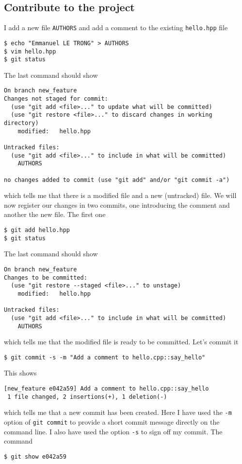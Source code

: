 \documentclass[a4paper]{article}
\begin{document}
\subsection{Contribute to the project}
I add a new file \texttt{AUTHORS} and add a comment to the existing \texttt{hello.hpp} file
\begin{verbatim}
$ echo "Emmanuel LE TRONG" > AUTHORS
$ vim hello.hpp
$ git status
\end{verbatim}
The last command should show
\begin{verbatim}
On branch new_feature
Changes not staged for commit:
  (use "git add <file>..." to update what will be committed)
  (use "git restore <file>..." to discard changes in working directory)
	modified:   hello.hpp

Untracked files:
  (use "git add <file>..." to include in what will be committed)
	AUTHORS

no changes added to commit (use "git add" and/or "git commit -a")
\end{verbatim}
which tells me that there is a modified file and a new (untracked) file.
We will now register our changes in two commits, one introducing the comment and
another the new file. The first one
\begin{verbatim}
$ git add hello.hpp
$ git status
\end{verbatim}
The last command should show
\begin{verbatim}
On branch new_feature
Changes to be committed:
  (use "git restore --staged <file>..." to unstage)
	modified:   hello.hpp

Untracked files:
  (use "git add <file>..." to include in what will be committed)
	AUTHORS
\end{verbatim}
which tells me that the modified file is ready to be committed.
Let's commit it
\begin{verbatim}
$ git commit -s -m "Add a comment to hello.cpp::say_hello"
\end{verbatim}
This shows
\begin{verbatim}
[new_feature e042a59] Add a comment to hello.cpp::say_hello
 1 file changed, 2 insertions(+), 1 deletion(-)
\end{verbatim}
which tells me that a new commit has been created. Here I have used the
\texttt{-m} option of \texttt{git commit} to provide a short commit message
directly on the command line. I also have used the option \texttt{-s} to sign
off my commit. The command
\begin{verbatim}
$ git show e042a59
\end{verbatim}
\end{document}
